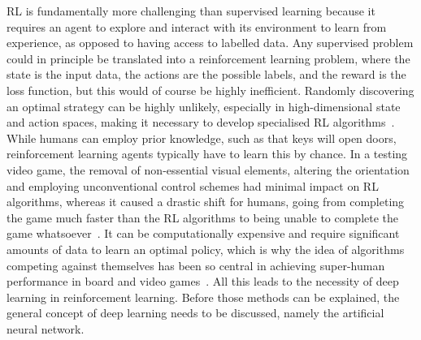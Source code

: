 RL is fundamentally more challenging than supervised learning because it requires an agent to explore and interact with its environment to learn from experience, as opposed to having access to labelled data.
Any supervised problem could in principle be translated into a reinforcement learning problem, where the state is the input data, the actions are the possible labels, and the reward is the loss function, but this would of course be highly inefficient.
Randomly discovering an optimal strategy can be highly unlikely, especially in high-dimensional state and action spaces, making it necessary to develop specialised RL algorithms~\autocite{sutton2018}.
While humans can employ prior knowledge, such as that keys will open doors, reinforcement learning agents typically have to learn this by chance.
In a testing video game, the removal of non-essential visual elements, altering the orientation and employing unconventional control schemes had minimal impact on RL algorithms, whereas it caused a drastic shift for humans, going from completing the game much faster than the RL algorithms to being unable to complete the game whatsoever~\autocite{dubey2018}.
It can be computationally expensive and require significant amounts of data to learn an optimal policy, which is why the idea of algorithms competing against themselves has been so central in achieving super-human performance in board and video games~\autocite{silver2016}.
All this leads to the necessity of deep learning in reinforcement learning.
Before those methods can be explained, the general concept of deep learning needs to be discussed, namely the artificial neural network.